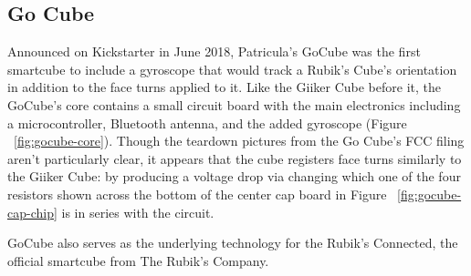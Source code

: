 \subsection{Go Cube}

Announced on Kickstarter in June 2018, Patricula's GoCube was the first smartcube to include a gyroscope that would track a Rubik's Cube's orientation in addition to the face turns applied to it. \cite{gocube-product-launch-video}
Like the Giiker Cube before it, the GoCube's core contains a small circuit board with the main electronics including a microcontroller, Bluetooth antenna, and the added gyroscope (Figure ~\ref{fig:gocube-core}). 
Though the teardown pictures from the Go Cube's FCC filing aren't particularly clear, it appears that the cube registers face turns similarly to the Giiker Cube: by producing a voltage drop via changing which one of the four resistors shown across the bottom of the center cap board in Figure ~\ref{fig:gocube-cap-chip} is in series with the circuit.

GoCube also serves as the underlying technology for the Rubik's Connected, the official smartcube from The Rubik's Company. \cite{gocube-rubiksconnected}

